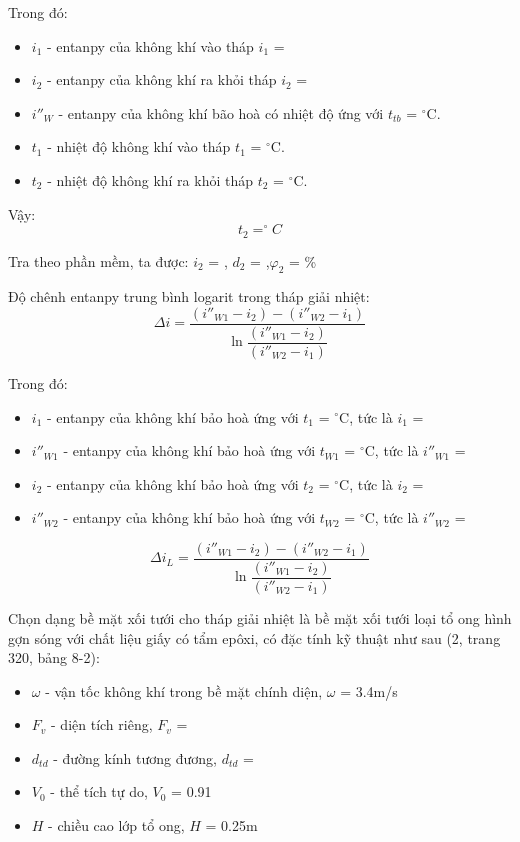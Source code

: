 Trong đó:
\begin{itemize}
	\item $i_{1}$ - entanpy của không khí vào tháp $i_{1}$ = 
	\item $i_{2}$ - entanpy của không khí ra khỏi tháp $i_{2}$ =
	\item $i''_{W}$ - entanpy của không khí bão hoà có nhiệt độ ứng với $t_{tb}$ = $^{\circ}$C.
	\item $t_{1}$ - nhiệt độ không khí vào tháp $t_{1}$ = $^{\circ}$C.
	\item $t_{2}$ - nhiệt độ không khí ra khỏi tháp $t_{2}$ = $^{\circ}$C.
\end{itemize}

Vậy:
\begin{equation*}
	t_{2} = ^{\circ}C
\end{equation*}

Tra theo phần mềm, ta được: $i_{2}$ = , $d_{2}$ = ,$\varphi_{2}$ = \%

Độ chênh entanpy trung bình logarit trong tháp giải nhiệt:
\begin{equation*}
	\Delta i = \dfrac{(i''_{W1} - i_{2}) - (i''_{W2} - i_{1})}{\ln\dfrac{(i''_{W1} - i_{2})}{(i''_{W2} - i_{1})}}
\end{equation*}

Trong đó:
\begin{itemize}
	\item $i_{1}$ - entanpy của không khí bảo hoà ứng với $t_{1}$ = $^{\circ}$C, tức là $i_{1}$ = 
	\item $i''_{W1}$ - entanpy của không khí bảo hoà ứng với $t_{W1}$ = $^{\circ}$C, tức là $i''_{W1}$ = 
	\item $i_{2}$ - entanpy của không khí bảo hoà ứng với $t_{2}$ = $^{\circ}$C, tức là $i_{2}$ = 
	\item $i''_{W2}$ - entanpy của không khí bảo hoà ứng với $t_{W2}$ = $^{\circ}$C, tức là $i''_{W2}$ = 
\end{itemize}
\begin{equation*}
	\Delta i_{L} = \dfrac{(i''_{W1} - i_{2}) - (i''_{W2} - i_{1})}{\ln\dfrac{(i''_{W1} - i_{2})}{(i''_{W2} - i_{1})}}
\end{equation*}

Chọn dạng bề mặt xối tưới cho tháp giải nhiệt là bề mặt xối tưới loại tổ ong hình gợn sóng với chất liệu giấy có tẩm epôxi, có đặc tính kỹ thuật như sau (2, trang 320, bảng 8-2):
\begin{itemize}
	\item $\omega$ - vận tốc không khí trong bề mặt chính diện, $\omega$ = 3.4m/s
	\item $F_{v}$ - diện tích riêng, $F_{v}$ = 
	\item $d_{td}$ - đường kính tương đương, $d_{td}$ = 
	\item $V_{0}$ - thể tích tự do, $V_{0}$ = 0.91 
	\item $H$ - chiều cao lớp tổ ong, $H$ = 0.25m
\end{itemize}

